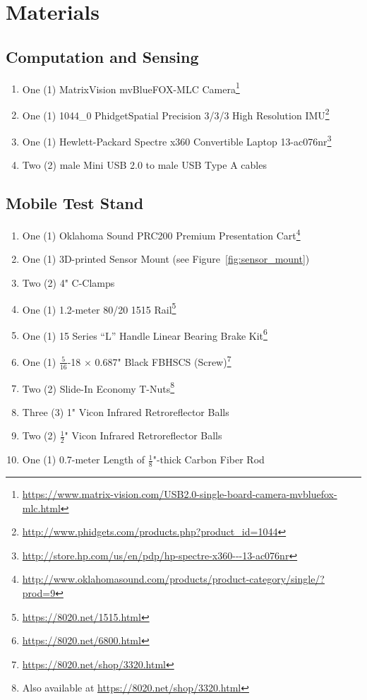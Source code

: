 \section{Materials}
\subsection{Computation and Sensing}
\begin{enumerate}
\item One (1) MatrixVision mvBlueFOX-MLC Camera\footnote{\url{https://www.matrix-vision.com/USB2.0-single-board-camera-mvbluefox-mlc.html}}
\item One (1) 1044\_0 PhidgetSpatial Precision 3/3/3 High Resolution IMU\footnote{\url{http://www.phidgets.com/products.php?product_id=1044}}
\item One (1) Hewlett-Packard Spectre x360 Convertible Laptop 13-ac076nr\footnote{\url{http://store.hp.com/us/en/pdp/hp-spectre-x360---13-ac076nr}}
\item Two (2) male Mini USB 2.0 to male USB Type A cables
\end{enumerate}

\subsection{Mobile Test Stand}
\begin{enumerate}
\item One (1) Oklahoma Sound PRC200 Premium Presentation Cart\footnote{\url{http://www.oklahomasound.com/products/product-category/single/?prod=9}}
\item One (1) 3D-printed Sensor Mount (see Figure~\ref{fig:sensor_mount})
\item Two (2) 4" C-Clamps
\item One (1) 1.2-meter 80/20 1515 Rail\footnote{\url{https://8020.net/1515.html}}
\item One (1) 15 Series ``L'' Handle Linear Bearing Brake Kit\footnote{\url{https://8020.net/6800.html}}
\item One (1) $\frac{5}{16}$-18 $\times$ 0.687" Black FBHSCS (Screw)\footnote{\url{https://8020.net/shop/3320.html}}
\item Two (2) Slide-In Economy T-Nuts\footnote{Also available at \url{https://8020.net/shop/3320.html}}
\item Three (3) 1" Vicon Infrared Retroreflector Balls
\item Two (2) $\frac{1}{2}$" Vicon Infrared Retroreflector Balls
\item One (1) 0.7-meter Length of $\frac{1}{8}$"-thick Carbon Fiber Rod
\end{enumerate}


